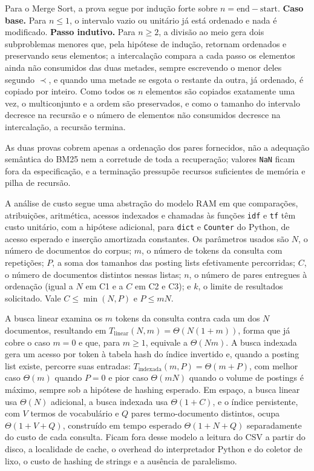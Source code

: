 \documentclass[12pt, a4paper]{article}
\begin{document}
Para o Merge Sort, a prova segue por indução forte sobre $n = \text{end} - \text{start}$. \textbf{Caso base.} Para $n \le 1$, o intervalo vazio ou unitário já está ordenado e nada é modificado. \textbf{Passo indutivo.} Para $n \ge 2$, a divisão ao meio gera dois subproblemas menores que, pela hipótese de indução, retornam ordenados e preservando seus elementos; a intercalação compara a cada passo os elementos ainda não consumidos das duas metades, sempre escrevendo o menor deles segundo $\prec$, e quando uma metade se esgota o restante da outra, já ordenado, é copiado por inteiro. Como todos os $n$ elementos são copiados exatamente uma vez, o multiconjunto e a ordem são preservados, e como o tamanho do intervalo decresce na recursão e o número de elementos não consumidos decresce na intercalação, a recursão termina.

As duas provas cobrem apenas a ordenação dos pares fornecidos, não a adequação semântica do BM25 nem a corretude de toda a recuperação; valores \texttt{NaN} ficam fora da especificação, e a terminação pressupõe recursos suficientes de memória e pilha de recursão.

A análise de custo segue uma abstração do modelo RAM em que comparações, atribuições, aritmética, acessos indexados e chamadas às funções \texttt{idf} e \texttt{tf} têm custo unitário, com a hipótese adicional, para \texttt{dict} e \texttt{Counter} do Python, de acesso esperado e inserção amortizada constantes. Os parâmetros usados são $N$, o número de documentos do corpus; $m$, o número de tokens da consulta com repetições; $P$, a soma dos tamanhos das posting lists efetivamente percorridas; $C$, o número de documentos distintos nessas listas; $n$, o número de pares entregues à ordenação (igual a $N$ em C1 e a $C$ em C2 e C3); e $k$, o limite de resultados solicitado. Vale $C \le \min(N,P)$ e $P \le mN$.

A busca linear examina os $m$ tokens da consulta contra cada um dos $N$ documentos, resultando em $T_{\text{linear}}(N,m) = \Theta(N(1+m))$, forma que já cobre o caso $m=0$ e que, para $m \ge 1$, equivale a $\Theta(Nm)$. A busca indexada gera um acesso por token à tabela hash do índice invertido e, quando a posting list existe, percorre suas entradas: $T_{\text{indexada}}(m,P) = \Theta(m+P)$, com melhor caso $\Theta(m)$ quando $P=0$ e pior caso $\Theta(mN)$ quando o volume de postings é máximo, sempre sob a hipótese de hashing esperado. Em espaço, a busca linear usa $\Theta(N)$ adicional, a busca indexada usa $\Theta(1+C)$, e o índice persistente, com $V$ termos de vocabulário e $Q$ pares termo-documento distintos, ocupa $\Theta(1+V+Q)$, construído em tempo esperado $\Theta(1+N+Q)$ separadamente do custo de cada consulta. Ficam fora desse modelo a leitura do CSV a partir do disco, a localidade de cache, o overhead do interpretador Python e do coletor de lixo, o custo de hashing de strings e a ausência de paralelismo.
\end{document}
